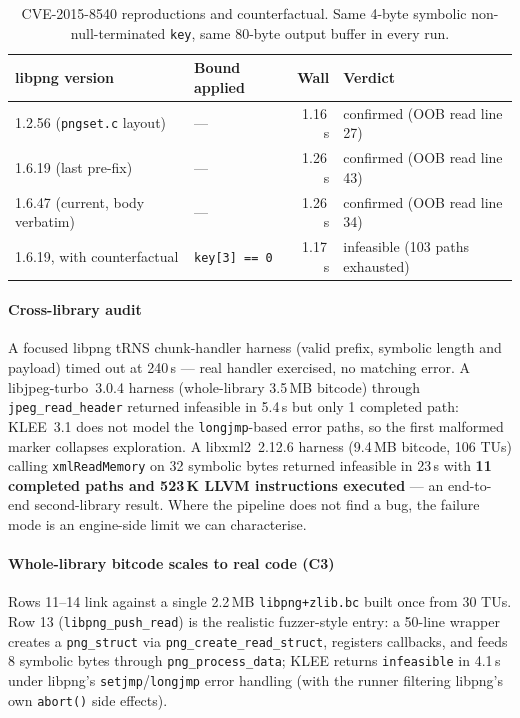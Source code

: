 \documentclass[3p,times,procedia]{elsarticle}
\begin{document}
\begin{table}[t]
\caption{CVE-2015-8540 reproductions and counterfactual. Same 4-byte symbolic non-null-terminated \texttt{key}, same 80-byte output buffer in every run.}
\label{tab:cve}
\begin{tabular*}{\hsize}{@{\extracolsep{\fill}}llrl@{}}
\toprule
\textbf{libpng version} & \textbf{Bound applied} & \textbf{Wall} & \textbf{Verdict} \\
\midrule
1.2.56 (\texttt{pngset.c} layout)        & ---                       & 1.16\,s & confirmed (OOB read line 27) \\
1.6.19 (last pre-fix)                    & ---                       & 1.26\,s & confirmed (OOB read line 43) \\
1.6.47 (current, body verbatim)          & ---                       & 1.26\,s & confirmed (OOB read line 34) \\
1.6.19, with counterfactual              & \texttt{key[3] == 0}      & 1.17\,s & infeasible (103 paths exhausted) \\
\bottomrule
\end{tabular*}
\end{table}

\paragraph{Cross-library audit} A focused libpng tRNS chunk-handler harness (valid prefix, symbolic length and payload) timed out at 240\,s --- real handler exercised, no matching error. A libjpeg-turbo~3.0.4 harness (whole-library 3.5\,MB bitcode) through \texttt{jpeg\_read\_header} returned infeasible in 5.4\,s but only 1 completed path: KLEE~3.1 does not model the \texttt{longjmp}-based error paths, so the first malformed marker collapses exploration. A libxml2~2.12.6 harness (9.4\,MB bitcode, 106 TUs) calling \texttt{xmlReadMemory} on 32 symbolic bytes returned infeasible in 23\,s with \textbf{11 completed paths and 523\,K LLVM instructions executed} --- an end-to-end second-library result. Where the pipeline does not find a bug, the failure mode is an engine-side limit we can characterise.

\paragraph{Whole-library bitcode scales to real code (C3)} Rows 11--14 link against a single 2.2\,MB \texttt{libpng+zlib.bc} built once from 30 TUs. Row 13 (\texttt{libpng\_push\_read}) is the realistic fuzzer-style entry: a 50-line wrapper creates a \texttt{png\_struct} via \texttt{png\_create\_read\_struct}, registers callbacks, and feeds 8 symbolic bytes through \texttt{png\_process\_data}; KLEE returns \texttt{infeasible} in 4.1\,s under libpng's \texttt{setjmp}/\texttt{longjmp} error handling (with the runner filtering libpng's own \texttt{abort()} side effects).
\end{document}
